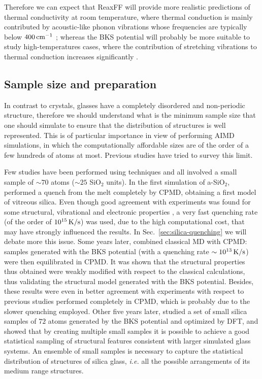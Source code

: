 Therefore we can expect that ReaxFF will provide more realistic predictions of thermal conductivity at room temperature, where thermal conduction is mainly contributed by acoustic-like phonon vibrations whose frequencies are typically below $400\,\mathrm{cm^{-1}}$ \cite{Bhattarai2016}; whereas the BKS potential will probably be more suitable to study high-temperatures cases, where the contribution of stretching vibrations to thermal conduction increases significantly \cite{Tian2017}. 



\subsection{Sample size and preparation}  \label{sec:silica-size}
In contrast to crystals, glasses have a completely disordered and non-periodic structure, therefore we should understand what is the minimum sample size that one should simulate to ensure that the distribution of structures is well represented. This is of particular importance in view of performing AIMD simulations, in which the computationally affordable sizes are of the order of a few hundreds of atoms at most. Previous studies have tried to survey this limit. 

Few studies have been performed using \abinitio techniques and all involved a small sample of $\sim 70$ atoms ($\sim 25$ SiO$_2$ units). In the first \abinitio simulation of a-SiO$_2$, \citet{Sarnthein1995a} performed a quench from the melt completely by CPMD, obtaining a first model of vitreous silica. Even though good agreement with experiments was found for some structural, vibrational and electronic properties \cite{Sarnthein1995a,Sarnthein1995b,Sarnthein1997}, a very fast quenching rate (of the order of $10^{15}\,\mathrm{K/s}$) was used, due to the high computational cost, that may have strongly influenced the results. In Sec.~\ref{sec:silica-quenching} we will debate more this issue. 
Some years later, \citet{Benoit2000} combined classical MD with CPMD: samples generated with the BKS potential (with a quenching rate $\sim 10^{13}\,\mathrm{K/s}$) were then equilibrated in CPMD. It was shown that the structural properties thus obtained were weakly modified with respect to the classical calculations, thus validating the structural model generated with the BKS potential. Besides, these results were even in better agreement with experiments with respect to previous studies performed completely in CPMD, which is probably due to the slower quenching employed. 
Other five years later, \citet{VanGinhoven2005} studied a set of small silica samples of $72$ atoms generated by the BKS potential and optimized by DFT, and showed that by creating multiple small samples it is possible to achieve a good statistical sampling of structural features consistent with larger simulated glass systems. An ensemble of small samples is necessary to capture the statistical distribution of structures of silica glass, \emph{i.e.} all the possible arrangements of its medium range structures. 

